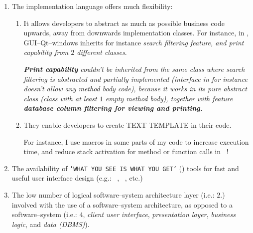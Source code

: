 \begin{enumerate}[1.]

	\item The implementation language \cplusplus
		offers much flexibility:
		
		\begin{enumerate}[1.]
			\item \emph{}
			
			It allows developers to abstract as much as possible
			business code upwards, away from downwards implementation
			classes. For instance,  in \yerotherpblack,
			GUI--Qt--windows inherits for instance
			\emph{search filtering feature, and print capability
			from $2$ different classes}.

			\emph{\textbf{Print capability} couldn't be inherited from the
			same class where search filtering is abstracted and
			partially implemented (interface in \Java for instance
			doesn't allow any method body code), because it works
			in its pure abstract class (\cplusplus class with at
			least $1$ empty method body), together with feature
			\textbf{database column filtering for viewing and printing.}}
			\newline
			
			\emph{}
			\newline
		
			\item \emph{}

			They enable developers to create TEXT TEMPLATE in their code.	
					
			For instance, I use macros in some parts of my code
			to increase execution time, and reduce stack activation for
			method or function calls in \yerotherpblack\ !						
			\newline
						
		\end{enumerate}						
		
	\item The availability of \texttt{'WHAT YOU SEE IS WHAT YOU GET'}
		(\wy) tools for fast and useful
		user interface design (e.g.: \qtdesigner~\cite{qtdesigner:2020},
		\ministudio~\cite{miniStudio:2020}, etc.)
		
	\item The low number of logical software--system architecture
		layer (i.e.: $2$.) involved with the use
		of a \thickclient software--system architecture, as
		opposed to a \webbrowserbased software--system (i.e.: $4$,
		\emph{client user interface}, \emph{presentation layer},
		\emph{business logic}, and \emph{data (DBMS)}).
	
\end{enumerate}
